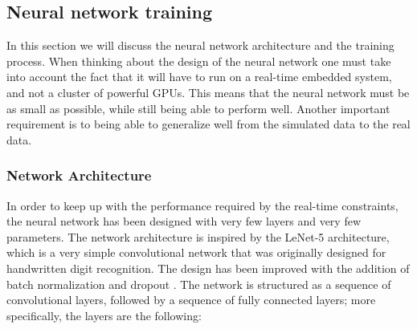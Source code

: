 \documentclass[a4paper,12pt,sort&compress]{article}
\begin{document}
\clearpage

        
\subsection{Neural network training} \label{sec:nn_training}
    In this section we will discuss the neural network architecture and the training process. When
    thinking about the design of the neural network one must take into account the fact that it will
    have to run on a real-time embedded system, and not a cluster of powerful GPUs. This means that 
    the neural network must be as small as possible, while still being able to perform well. Another
    important requirement is to being able to generalize well from the simulated data to the real data.

\subsubsection*{Network Architecture}
    In order to keep up with the performance required by the real-time constraints, the neural
    network has been designed with very few layers and very few parameters. The network architecture
    is inspired by the LeNet-5 \citep*{lecun} architecture, which is a very simple convolutional
    network that was originally designed for handwritten digit recognition. The design has been
    improved with the addition of batch normalization \citep*{batch_norm} and dropout
    \citep*{dropout}.
    The network is structured as a sequence of convolutional layers, followed by a sequence of fully
    connected layers; more specifically, the layers are the following:
\end{document}
